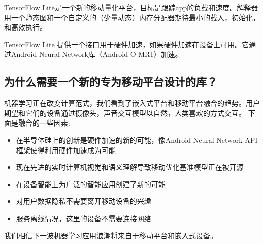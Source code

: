 TensorFlow Lite是一个新的移动量化平台，目标是跟踪app的负载和速度。解释器用一个静态图和一个自定义的（少量动态）内存分配器期待最小的载入，初始化，和高效执行。

TensorFlow Lite 提供一个接口用于硬件加速，如果硬件加速在设备上可用。它通过Android Neural Network库（Android O-MR1）加速。
\subsection{为什么需要一个新的专为移动平台设计的库？}
机器学习正在改变计算范式，我们看到了嵌入式平台和移动平台融合的趋势。用户期望和它们的设备通过摄像头，声音交互模型以自然，人类喜欢的方式交互。
下面是融合的一些因素:
\begin{itemize}
\item 在半导体硅上的创新是硬件加速的新的可能，像Android Neural Network API框架使得利用硬件加速成为可能
\item 现在先进的实时计算机视觉和语义理解导致移动优化基准模型正在被开源
\item 在设备智能上为广泛的智能应用创建了新的可能
\item 对用户数据隐私不需要离开移动设备的兴趣
\item 服务离线情况，这里的设备不需要连接网络
\end{itemize}
我们相信下一波机器学习应用浪潮将来自于移动平台和嵌入式设备。
